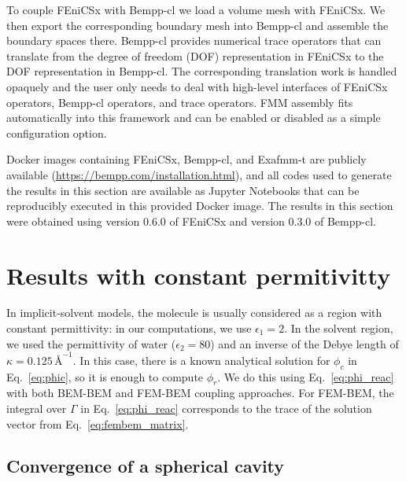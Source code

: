 To couple FEniCSx with Bempp-cl we load a volume mesh with FEniCSx. We then export the corresponding boundary mesh into Bempp-cl and assemble the boundary spaces there. Bempp-cl provides numerical trace operators that can translate from the degree of freedom (DOF) representation in FEniCSx to the DOF representation in Bempp-cl. The corresponding translation work is handled opaquely and the user only needs to deal with high-level interfaces of FEniCSx operators, Bempp-cl operators, and trace operators. FMM assembly fits automatically into this framework and can be enabled or disabled as a simple configuration option.

Docker images containing FEniCSx, Bempp-cl, and Exafmm-t are publicly available (\href{https://bempp.com/installation.html}{https://bempp.com/installation.html}), and all codes used to generate the results in this section are available as Jupyter Notebooks that can be reproducibly executed in this provided Docker image. The results in this section were obtained using version 0.6.0 of FEniCSx and version 0.3.0 of Bempp-cl. 

\section*{\sffamily \Large Results with constant permitivitty}

In implicit-solvent models, the molecule is usually considered as a region with constant permittivity: in our computations, we use $\epsilon_1=2$.
In the solvent region, we used the permittivity of water ($\epsilon_2=80$) and an inverse of the Debye length of $\kappa=0.125\,\text{\AA}^{-1}$.
In this case, there is a known analytical solution for $\phi_c$ in Eq.~\eqref{eq:phic}, so it is enough to compute $\phi_r$. We do this using Eq.~\eqref{eq:phi_reac} with both BEM-BEM and FEM-BEM coupling approaches. For FEM-BEM, the integral over $\Gamma$ in Eq.~\eqref{eq:phi_reac} corresponds to the trace of the solution vector from Eq.~\eqref{eq:fembem_matrix}.

\subsection*{\sffamily \large Convergence of a spherical cavity}

